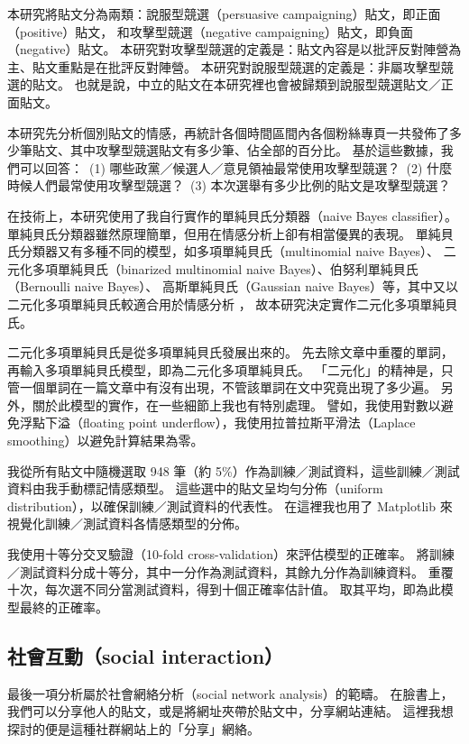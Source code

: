 \documentclass[letterpaper, 10pt, conference]{ieeeconf}   %
\begin{document}
\begin{CJK}{UTF8}{bsmi}
本研究將貼文分為兩類：說服型競選（persuasive campaigning）貼文，即正面（positive）貼文，%
和攻擊型競選（negative campaigning）貼文，即負面（negative）貼文。%
本研究對攻擊型競選的定義是：貼文內容是以批評反對陣營為主、貼文重點是在批評反對陣營。%
本研究對說服型競選的定義是：非屬攻擊型競選的貼文。%
也就是說，中立的貼文在本研究裡也會被歸類到說服型競選貼文／正面貼文。%

本研究先分析個別貼文的情感，再統計各個時間區間內各個粉絲專頁一共發佈了多少筆貼文、其中攻擊型競選貼文有多少筆、佔全部的百分比。%
基於這些數據，我們可以回答：%
\,(1) 哪些政黨／候選人／意見領袖最常使用攻擊型競選？%
\,(2) 什麼時候人們最常使用攻擊型競選？%
\,(3) 本次選舉有多少比例的貼文是攻擊型競選？%

在技術上，本研究使用了我自行實作的單純貝氏分類器（naive Bayes classifier）\cite{c13}。%
單純貝氏分類器雖然原理簡單，但用在情感分析上卻有相當優異的表現。%
單純貝氏分類器又有多種不同的模型，如多項單純貝氏（multinomial naive Bayes）、%
二元化多項單純貝氏（binarized multinomial naive Bayes）、伯努利單純貝氏（Bernoulli naive Bayes）、%
高斯單純貝氏（Gaussian naive Bayes）等，其中又以二元化多項單純貝氏較適合用於情感分析 \cite{c14}，%
故本研究決定實作二元化多項單純貝氏。%

二元化多項單純貝氏是從多項單純貝氏發展出來的。%
先去除文章中重覆的單詞，再輸入多項單純貝氏模型，即為二元化多項單純貝氏。%
「二元化」的精神是，只管一個單詞在一篇文章中有沒有出現，不管該單詞在文中究竟出現了多少遍。%
另外，關於此模型的實作，在一些細節上我也有特別處理。%
譬如，我使用對數以避免浮點下溢（floating point underflow），我使用拉普拉斯平滑法（Laplace smoothing）以避免計算結果為零。%

我從所有貼文中隨機選取 948 筆（約 5\%）作為訓練／測試資料，這些訓練／測試資料由我手動標記情感類型。%
這些選中的貼文呈均勻分佈（uniform distribution），以確保訓練／測試資料的代表性。%
在這裡我也用了 Matplotlib 來視覺化訓練／測試資料各情感類型的分佈。%

我使用十等分交叉驗證（10-fold cross-validation）來評估模型的正確率。%
將訓練／測試資料分成十等分，其中一分作為測試資料，其餘九分作為訓練資料。%
重覆十次，每次選不同分當測試資料，得到十個正確率估計值。%
取其平均，即為此模型最終的正確率。%

\subsection*{社會互動（social interaction）}

最後一項分析屬於社會網絡分析（social network analysis）的範疇。%
在臉書上，我們可以分享他人的貼文，或是將網址夾帶於貼文中，分享網站連結。%
這裡我想探討的便是這種社群網站上的「分享」網絡。%


\end{CJK}
\end{document}
